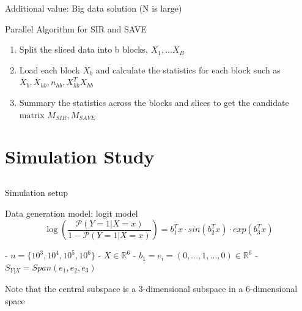 \documentclass[ignorenonframetext,]{beamer}
\providecommand{\tightlist}{%
  \setlength{\itemsep}{0pt}\setlength{\parskip}{0pt}}
\begin{document}
\begin{frame}{Additional value: Big data solution (N is large)}

\begin{block}{Parallel Algorithm for SIR and SAVE}

\begin{enumerate}
\def\labelenumi{\arabic{enumi}.}
\tightlist
\item
  Split the sliced data into b blocks, \(X_1, \dots X_B\)\\
\item
  Load each block \(X_b\) and calculate the statistics for each block
  such as \(\bar{X}_b, \bar{X}_{hb}, n_{hb}, X^T_{hb}X_{hb}\)\\
\item
  Summary the statistics across the blocks and slices to get the
  candidate matrix \(M_{SIR}, M_{SAVE}\)
\end{enumerate}

\end{block}

\end{frame}

\section{Simulation Study}\label{simulation-study}

\subsection{}\label{section}

\begin{frame}{Simulation setup}

\begin{block}{Data generation model: logit model}
\[
    \log\left(\frac{\mathcal{P}(Y=1|X=x)}{1-\mathcal{P}(Y=1|X=x)}\right) = b_1^Tx \cdot sin(b_2^Tx) \cdot exp(b_3^Tx)
\]

- $n = \{10^3, 10^4, 10^5,10^6\}$
- $X \in \mathbb{R}^6$
- $b_1 = e_i = (0, \dots, 1, \dots,0) \in \mathbb{R}^6$
- $S_{Y|X} = Span(e_1, e_2, e_3)$
\end{block}

Note that the central subspace is a 3-dimensional subspace in a
6-dimensional space

\end{frame}
\end{document}
